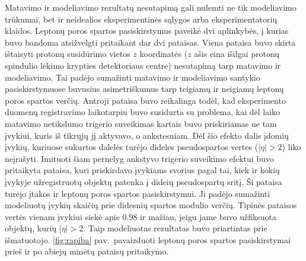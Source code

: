 \documentclass[a4paper, 12pt, oneside]{article}
\begin{document}
Matavimo ir modeliavimo rezultatų nesutapimą gali nulemti ne tik modeliavimo trūkumai, bet ir neidealios eksperimentinės sąlygos
arba eksperimentatorių klaidos.
Leptonų poros spartos pasiskirstymus paveikė dvi aplinkybės, į kurias buvo bandoma atsižvelgti pritaikant dar dvi pataisas.
Viena pataisa buvo skirta ištaisyti protonų susidūrimo vietos $z$ koordinatės ($z$ ašis eina išilgai protonų
spindulio lėkimo krypties detektoriaus centre) nesutapimą tarp matavimo ir modeliavimo.
Tai padėjo sumažinti matavimo ir modeliavimo santykio pasiskirstymuose buvusius asimetriškumus tarp teigiamų ir neigiamų leptonų
poros spartos verčių.
Antroji pataisa buvo reikalinga todėl, kad eksperimento duomenų registravimo laikotarpiu buvo susidurta su problema,
kai dėl laiko matavimo netikslumo trigerio suveikimas kartais buvo priskiriamas ne tam įvykiui, kuris iš tikrųjų jį aktyvavo, o
ankstesniam.
Dėl šio efekto dalis įdomių įvykių, kuriuose sukurtos dalelės turėjo dideles pseudospartos vertes ($|\eta|>2$) liko neįrašyti.
Imituoti šiam pernelyg ankstyvo trigerio suveikimo efektui buvo pritaikyta pataisa, kuri priskirdavo įvykiams
svorius pagal tai, kiek ir kokių įvykyje užregistruotų objektų patenka į dideių pseudospartų sritį.
Ši pataisa turėjo įtakos ir leptonų poros spartos pasiskirstymui.
Ji padėjo sumažinti modeliuotų įvykių skaičių prie didesnių spartos modulio verčių.
Tipinės pataisos vertės vienam įvykiui siekė apie $0.98$ ir mažiau, jeigu jame buvo užfiksuota objektų, kurių $|\eta|>2$.
Taip modeliuotas rezultatas buvo priartintas prie išmatuotojo.
\ref{fig:rapiba} pav.\ pavaizduoti leptonų poros spartos pasiskirstymai prieš ir po abiejų minėtų pataisų pritaikymo.
\end{document}
